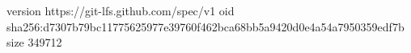 version https://git-lfs.github.com/spec/v1
oid sha256:d7307b79bc11775625977e39760f462bca68bb5a9420d0e4a54a7950359edf7b
size 349712
